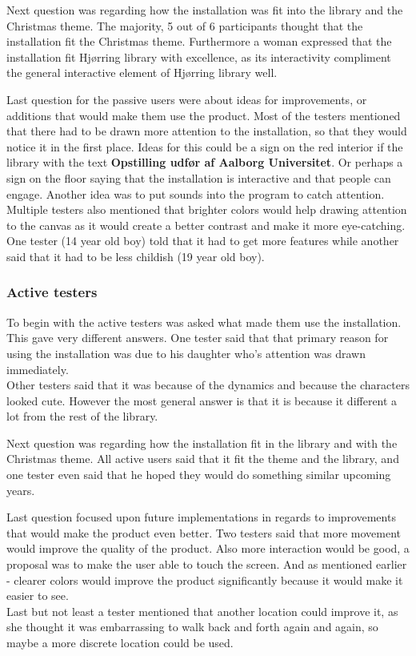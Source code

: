 Next question was regarding how the installation was fit into the library and the Christmas theme. The majority, 5 out of 6 participants thought that the installation fit the Christmas theme. Furthermore a woman expressed that the installation fit Hj{\o}rring library with excellence, as its interactivity compliment the general interactive element of Hj{\o}rring library well. 

Last question for the passive users were about ideas for improvements, or additions that would make them use the product.
Most of the testers mentioned that there had to be drawn more attention to the installation, so that they would notice it in the first place. Ideas for this could be a sign on the red interior if the library with the text \textbf{Opstilling udfør af Aalborg Universitet}. Or perhaps a sign on the floor saying that the installation is interactive and that people can engage. Another idea was to put sounds into the program to catch attention. Multiple testers also mentioned that brighter colors would help drawing attention to the canvas as it would create a better contrast and make it more eye-catching. 
One tester (14 year old boy) told that it had to get more features while another said that it had to be less childish (19 year old boy).

\subsubsection{Active testers}
To begin with the active testers was asked what made them use the installation. This gave very different answers. One tester said that that primary reason for using the installation was due to his daughter who's attention was drawn immediately.\\
Other testers said that it was because of the dynamics and because the characters looked cute. However the most general answer is that it is because it different a lot from the rest of the library.

Next question was regarding how the installation fit in the library and with the Christmas theme. All active users said that it fit the theme and the library, and one tester even said that he hoped they would do something similar upcoming years.

Last question focused upon future implementations in regards to improvements that would make the product even better. Two testers said that more movement would improve the quality of the product. Also more interaction would be good, a proposal was to make the user able to touch the screen.
And as mentioned earlier - clearer colors would improve the product significantly because it would make it easier to see.\\
Last but not least a tester mentioned that another location could improve it, as she thought it was embarrassing to walk back and forth again and again, so maybe a more discrete location could be used.

